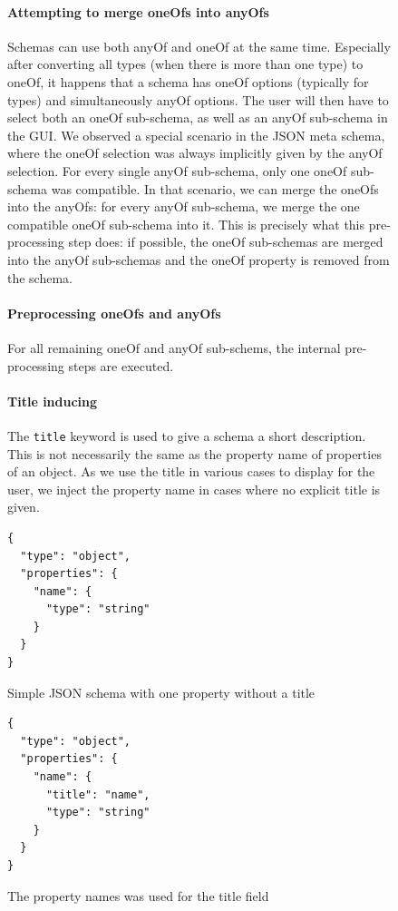 \begin{figure}[h]
\paragraph{Attempting to merge oneOfs into anyOfs}
Schemas can use both anyOf and oneOf at the same time.
Especially after converting all types (when there is more than one type) to oneOf, it happens that a schema has oneOf options (typically for types) and simultaneously anyOf options.
The user will then have to select both an oneOf sub-schema, as well as an anyOf sub-schema in the GUI.
We observed a special scenario in the JSON meta schema, where the oneOf selection was always implicitly given by the anyOf selection.
For every single anyOf sub-schema, only one oneOf sub-schema was compatible.
In that scenario, we can merge the oneOfs into the anyOfs: for every anyOf sub-schema, we merge the one compatible oneOf sub-schema into it.
This is precisely what this pre-processing step does: if possible, the oneOf sub-schemas are merged into the anyOf sub-schemas and the oneOf property is removed from the schema.


\paragraph{Preprocessing oneOfs and anyOfs}
For all remaining oneOf and anyOf sub-schems, the internal pre-processing steps are executed.


\paragraph{Title inducing}

The \texttt{title} keyword is used to give a schema a short description.
This is not necessarily the same as the property name of properties of an object.
As we use the title in various cases to display for the user, we inject the property name in cases where no explicit title is given.

\begin{listing}[!h]
    \begin{verbatim}
{
  "type": "object",
  "properties": {
    "name": {
      "type": "string"
    }
  }
}
    \end{verbatim}
    \caption{Simple JSON schema with one property without a title}
    \label{listing:no-title}
\end{listing}

\begin{listing}[!h]
    \begin{verbatim}
{
  "type": "object",
  "properties": {
    "name": {
      "title": "name",
      "type": "string"
    }
  }
}
    \end{verbatim}
    \caption{The property names was used for the title field}
    \label{listing:with-title}
\end{listing}


\end{figure}
